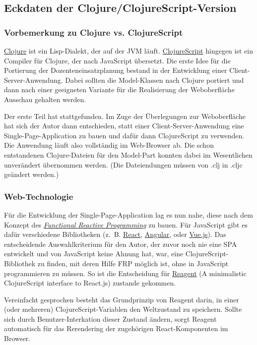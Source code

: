 \documentclass[11pt]{article}
\begin{document}
\subsection*{Eckdaten der Clojure/ClojureScript-Version}
\label{sec:org387cef8}
\subsubsection*{Vorbemerkung zu Clojure vs. ClojureScript}
\label{sec:org8e9fbe2}
\href{https://clojure.org}{Clojure} ist ein Lisp-Dialekt, der auf der JVM läuft. \href{https://clojurescript.org}{ClojureScript}
hingegen ist ein Compiler für Clojure, der nach JavaScript übersetzt.
Die erste Idee für die Portierung der Dozenteneinsatzplanung bestand
in der Entwicklung einer Client-Server-Anwendung. Dabei sollten die
Model-Klassen nach Clojure portiert und dann nach einer
geeigneten Variante für die Realisierung der Weboberfläche Ausschau
gehalten werden.

Der erste Teil hat stattgefunden. Im Zuge der Überlegungen zur
Weboberfläche hat sich der Autor dann entschieden, statt einer
Client-Server-Anwendung eine Single-Page-Application zu bauen und
dafür dann ClojureScript zu verwenden. Die Anwendung läuft also
vollständig im Web-Browser ab. Die schon entstandenen Clojure-Dateien
für den Model-Part konnten dabei im Wesentlichen unverändert übernommen
werden. (Die Dateiendungen müssen von .clj in .cljc geändert werden.)

\subsubsection*{Web-Technologie}
\label{sec:org047a50e}
Für die Entwicklung der Single-Page-Application lag es nun nahe, diese
nach dem Konzept des \emph{\href{https://en.wikipedia.org/wiki/Functional\_reactive\_programming}{Functional Reactive Programming}} zu bauen. Für
JavaScript gibt es dafür verschiedene Bibliotheken (z.~B. \href{https://reactjs.org}{React},
\href{https://angular.io}{Angular}, oder \href{https://vuejs.org}{Vue.js}). Das entscheidende Auswahlkriterium für den
Autor, der zuvor noch nie eine SPA entwickelt und von JavaScript keine
Ahnung hat, war, eine ClojureScript-Bibliothek zu finden, mit deren Hilfe
FRP möglich ist, ohne in JavaScript programmieren zu müssen. So ist
die Entscheidung für \href{https://github.com/reagent-project/reagent}{Reagent} (A minimalistic ClojureScript interface
to React.js) zustande gekommen.

Vereinfacht gesprochen besteht das Grundprinzip von Reagent darin, in
einer (oder mehreren) ClojureScript-Variablen den Weltzustand zu
speichern. Sollte sich durch Benutzer-Interkation dieser Zustand
ändern, sorgt Reagent automatisch für das Rerendering der zugehörigen
React-Komponenten im Browser. 
\end{document}
